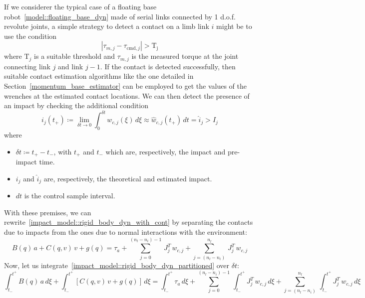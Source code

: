 \documentclass[letterpaper, 10 pt, conference]{ieeeconf}  %
\begin{document}
If we considerer the typical case of a floating base robot~\eqref{model::floating_base_dyn} made of serial links connected by 1 d.o.f. revolute joints, a simple strategy to detect a contact on a limb link $i$ might be to use the condition
\begin{equation}
\left|\tau_{m, j} - \tau_{\mathrm{cmd}, j}\right| > \mathrm{\mathrm{T}_{j}}
\end{equation}
where $\mathrm{T}_{j}$ is a suitable threshold and $\tau_{m, j}$ is the measured torque at the joint connecting link $j$ and link $j-1$. If the contact is detected successfully, then suitable contact estimation algorithms like the one detailed in Section~\ref{momentum_base_estimator} can be employed to get the values of the wrenches at the estimated contact locations. We can then detect the presence of an impact by checking the additional condition
\begin{equation}
i_j(t_{+}) \coloneqq \lim_{\delta t \rightarrow 0} \int_{0}^{\delta t} w_{c, j}(\xi)\,d\xi \approx \hat{w}_{c, j}(t_{+})\,dt = \hat{i}_j > I_j
\end{equation} 
where 
\begin{itemize}
\item $\delta t\coloneqq t_{+} - t_{-}$, with $t_{+}$ and $t_{-}$ which are, respectively, the impact and pre-impact time.
\item $i_j$ and $\hat{i}_j$ are, respectively, the theoretical and estimated impact.
\item $dt$ is the control sample interval.
\end{itemize}
With these premises, we can rewrite~\eqref{impact_model::rigid_body_dyn_with_cont} by separating the contacts due to impacts from the ones due to normal interactions with the environment:
\begin{dmath}\label{impact_model::rigid_body_dyn_partitioned}
B(q)\,a +C(q, v)\,v + g(q) = \tau_{a} + \sum_{j = 0}^{\left(n_l - n_i\right) - 1}\,J^{T}_{j}\,w_{c, j} + \sum_{j = \left(n_l - n_i\right)}^{n_l}\,J^{T}_{j}\,w_{c, j}
\end{dmath}
Now, let us integrate~\eqref{impact_model::rigid_body_dyn_partitioned} over $\delta t$:
\begin{dmath}\label{impact_model::rigid_body_dyn_int}
\int_{t_{-}}^{t^{+}}B(q)\,a\,d\xi + \int_{t_{-}}^{t^{+}}\left[C(q, v)\,v + g(q)\right]\,d\xi = \int_{t_{-}}^{t^{+}}\tau_{a}\,d\xi+ \sum_{j = 0}^{\left(n_l - n_i\right) - 1}\,\int_{t_{-}}^{t^{+}}J^{T}_{j}\,w_{c, j}\,d\xi + \sum_{j = \left(n_l - n_i\right)}^{n_l}\,\int_{t_{-}}^{t^{+}}J^{T}_{j}\,w_{c, j}\,d\xi
\end{dmath}
\end{document}
